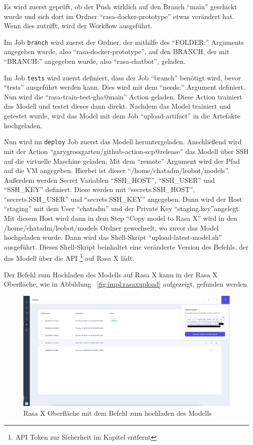Es wird zuerst geprüft, ob der Push wirklich auf den Branch ``main'' geschickt wurde und sich dort im Ordner ``rasa-docker-prototype'' etwas verändert hat.
Wenn dies zutrifft, wird der Workflow ausgeführt.

Im Job \texttt{branch} wird zuerst der Ordner, der mithilfe des ``FOLDER:'' Arguments angegeben wurde, also ``rasa-docker-prototype'', auf den BRANCH, der mit ``BRANCH:'' angegeben wurde, also ``rasa-chatbot'', geladen.

Im Job \texttt{tests} wird zuerst definiert, dass der Job ``branch'' benötigt wird, bevor ``tests'' ausgeführt werden kann.
Dies wird mit dem ``needs:'' Argument definiert.
Nun wird die ``rasa-train-test-gha@main'' Action geladen.
Diese Action trainiert das Modell und testet dieses dann direkt.
Nachdem das Model trainiert und getestet wurde, wird das Model mit dem Job ``upload-artifact'' in die Artefakte hochgeladen.

Nun wird im \texttt{deploy} Job zuerst das Modell heruntergeladen.
Anschließend wird mit der Action ``garygrossgarten/github-action-scp@release'' das Modell über SSH auf die virtuelle Maschine geladen.
Mit dem ``remote'' Argument wird der Pfad auf die VM angegeben.
Hierbei ist dieser ``/home/chatadm/leobot/models''.
Außerdem werden Secret Variablen ``SSH\_HOST'', ``SSH\_USER'' und ``SSH\_KEY'' definiert.
Diese werden mit ``secrets.SSH\_HOST'', ``secrets.SSH\_USER'' und ``secrets.SSH\_KEY'' angegeben.
Dann wird der Host ``staging'' mit dem User ``chatadm'' und der Private Key ``staging.key''angelegt.
Mit diesem Host wird dann in dem Step ``Copy model to Rasa X'' wird in den /home/chatadm/leobot/models Ordner gewechselt, wo zuvor das Model hochgeladen wurde.
Dann wird das Shell-Skript ``upload-latest-model.sh'' ausgeführt.
Dieses Shell-Skript beinhaltet eine veränderte Version des Befehls, der das Modell über die API \footnote{API Token zur Sicherheit im Kapitel entfernt} auf Rasa X lädt.

Der Befehl zum Hochladen des Modells auf Rasa X kann in der Rasa X Oberfläche, wie in Abbildung ~\ref{fig:impl:rasaxupload} aufgezeigt, gefunden werden.

\begin{figure}[hbt!]
    \centering
    \includegraphics[scale=0.25]{pics/rasaxapimodel}
    \caption{Rasa X Oberfläche mit dem Befehl zum hochladen des Modells}
    \label{fig:impl:rasaxapimodel}
\end{figure}

